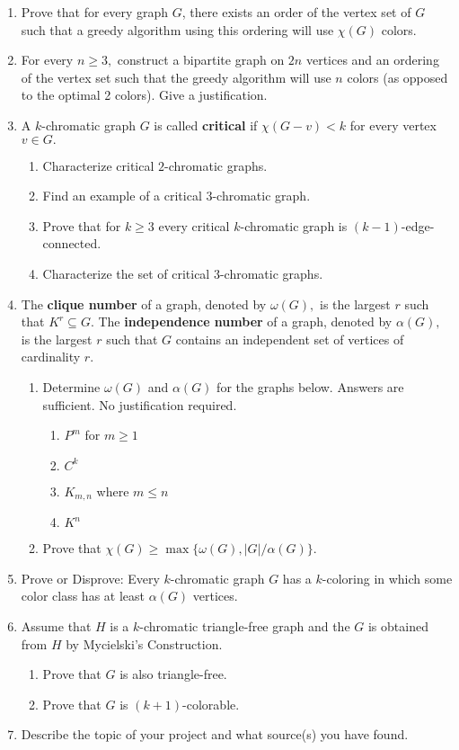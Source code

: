 \documentclass[12pt]{article}
\renewcommand{\emph}[1]{\textsf{\textbf{#1}}}
\begin{document}
\begin{enumerate}
	\item Prove that for every graph $G$, there exists an order of the vertex set of $G$ such that a greedy algorithm using this ordering will use $\chi(G)$ colors.
	\item For every $n \geq 3,$ construct a bipartite graph on $2n$ vertices and an ordering of the vertex set such that the greedy algorithm will use $n$ colors (as opposed to the optimal 2 colors). Give a justification.
	\item A $k$-chromatic graph $G$ is called \emph{critical} if $\chi(G-v) < k$ for every vertex $v \in G.$
	\begin{enumerate}
	\item Characterize critical $2$-chromatic graphs.
	\item Find an example of a critical $3$-chromatic graph.
	\item Prove that for $k\geq 3$ every critical $k$-chromatic graph is $(k-1)$-edge-connected.
	\item Characterize the set of critical $3$-chromatic graphs.
	\end{enumerate}
	\item The \emph{clique number} of a graph, denoted by $\omega(G),$ is the largest $r$ such that $K^r \subseteq G.$ The \emph{independence number} of a graph, denoted by $\alpha(G),$ is the largest $r$ such that $G$ contains an independent set of vertices of cardinality $r.$
	\begin{enumerate}
	\item Determine $\omega(G)$ and $\alpha(G)$ for the graphs below. Answers are sufficient. No justification required.
		\begin{enumerate}
		\item $P^m$ for $m\geq 1$
		\item $C^k$
		\item $K_{m,n}$ where $m \leq n$
		\item $K^n$
		\end{enumerate}
	\item Prove that $\chi(G) \geq \max\{ \omega(G), |G|/\alpha(G)\}.$
	\end{enumerate}
	\item Prove or Disprove: Every $k$-chromatic graph $G$ has a $k$-coloring in which some color class has at least $\alpha(G)$ vertices.
	\item Assume that $H$ is a $k$-chromatic triangle-free graph and the $G$ is obtained from $H$ by Mycielski's Construction.
	\begin{enumerate}
	\item Prove that $G$ is also triangle-free.
	\item Prove that $G$ is $(k+1)$-colorable.
	\end{enumerate}
	\item Describe the topic of your project and what source(s) you have found.
\end{enumerate}
\end{document}
